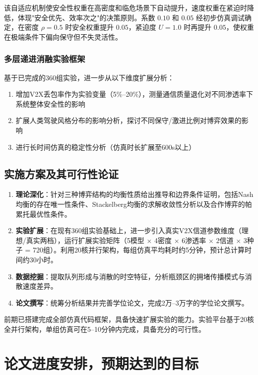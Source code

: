 该自适应机制使安全性权重在高密度和临危场景下自动提升，速度权重在紧迫时降低，体现"安全优先、效率次之"的决策原则。系数 $0.10$ 和 $0.05$ 经初步仿真调试确定，在密度 $\rho=0.5$ 时安全权重提升 $0.05$，紧迫度 $U=1.0$ 时再提升 $0.05$，使权重在极端条件下偏向保守但不失灵活性。

\subsubsection{多层递进消融实验框架}
基于已完成的360组实验，进一步从以下维度扩展分析：
\begin{enumerate}
    \item 增加V2X丢包率作为实验变量（5\%--20\%），测量通信质量退化对不同渗透率下系统整体安全性的影响
    \item 扩展人类驾驶风格分布的影响分析，探讨不同保守/激进比例对博弈效果的影响
    \item 进行长时间仿真的稳定性分析（仿真时长扩展至600s以上）
\end{enumerate}

\subsection{实施方案及其可行性论证}
\begin{enumerate}
    \item \textbf{理论深化}：针对三种博弈结构的均衡性质给出推导和边界条件证明，包括Nash均衡的存在唯一性条件、Stackelberg均衡的求解收敛性分析以及合作博弈的帕累托最优性条件。
    \item \textbf{实验扩展}：在现有360组实验基础上，进一步引入真实V2X信道参数维度（理想/真实两档），运行扩展实验矩阵（5模型 $\times$ 4密度 $\times$ 6渗透率 $\times$ 2信道 $\times$ 3种子 = 720组）。利用20核并行架构，每组仿真平均耗时约5分钟，预计总计算时间约30小时。
    \item \textbf{数据挖掘}：提取队列形成与消散的时空特征，分析瓶颈区的拥堵传播模式与消散速度差异。
    \item \textbf{论文撰写}：统筹分析结果并完善学位论文，完成2万--3万字的学位论文撰写。
\end{enumerate}

前期已搭建完成全部仿真代码框架，具备快速扩展实验的能力。实验平台基于20核全并行架构，单组仿真可在5--10分钟内完成，具备充分的可行性。

\section{论文进度安排，预期达到的目标}
